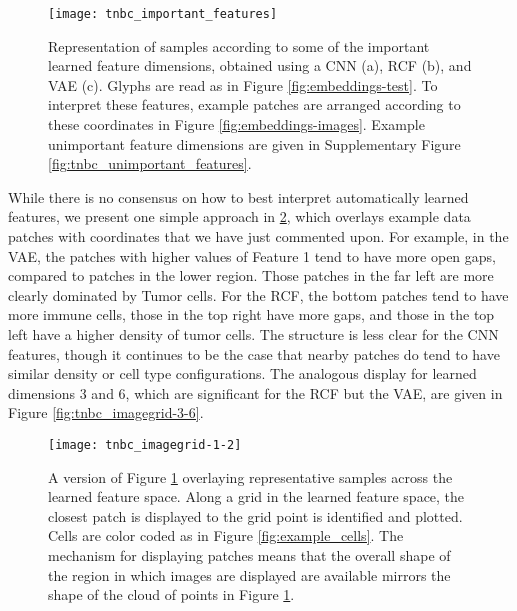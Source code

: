 \begin{figure}
  \centering
  \texttt{[image: tnbc\_important\_features]}
  \caption{Representation of samples according to some of the important learned
    feature dimensions, obtained using a CNN (a), RCF (b), and VAE (c). Glyphs
    are read as in Figure \ref{fig:embeddings-test}. To interpret these
    features, example patches are arranged according to these coordinates in
    Figure \ref{fig:embeddings-images}. Example unimportant feature dimensions
    are given in Supplementary Figure \ref{fig:tnbc_unimportant_features}.}
  \label{fig:tnbc_important_features}
\end{figure}

While there is no consensus on how to best interpret automatically learned
features, we present one simple approach in \ref{fig:tnbc_imagegrid}, which
overlays example data patches with coordinates that we have just commented upon.
For example, in the VAE, the patches with higher values of Feature 1 tend to
have more open gaps, compared to patches in the lower region. Those patches in
the far left are more clearly dominated by Tumor cells. For the RCF, the bottom
patches tend to have more immune cells, those in the top right have more gaps,
and those in the top left have a higher density of tumor cells. The structure is
less clear for the CNN features, though it continues to be the case that nearby
patches do tend to have similar density or cell type configurations. The
analogous display for learned dimensions 3 and 6, which are significant for the
RCF but the VAE, are given in Figure \ref{fig:tnbc_imagegrid-3-6}.

\begin{figure}
  \centering
  \texttt{[image: tnbc\_imagegrid-1-2]}
  \caption{A version of Figure \ref{fig:tnbc_important_features} overlaying
    representative samples across the learned feature space. Along a grid in the
    learned feature space, the closest patch is displayed to the grid point is
    identified and plotted. Cells are color coded as in Figure
    \ref{fig:example_cells}. The mechanism for displaying patches means that the
    overall shape of the region in which images are displayed are available
    mirrors the shape of the cloud of points in Figure
    \ref{fig:tnbc_important_features}. }
  \label{fig:tnbc_imagegrid}
\end{figure}

